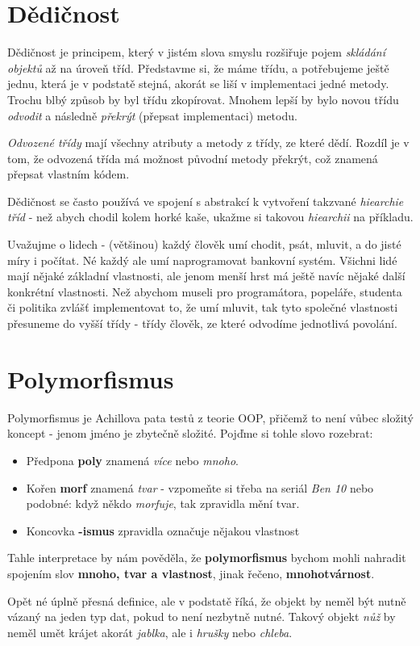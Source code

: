 \section{Dědičnost}
Dědičnost je principem, který v jistém slova smyslu rozšiřuje pojem \textit{skládání objektů} až na úroveň tříd. Představme si, že máme třídu, a potřebujeme ještě jednu, která je v podstatě stejná, akorát se liší v implementaci jedné metody. Trochu blbý způsob by byl třídu zkopírovat. Mnohem lepší by bylo novou třídu \textit{odvodit} a následně \textit{překrýt} (přepsat implementaci) metodu.

\textit{Odvozené třídy} mají všechny atributy a metody z třídy, ze které dědí. Rozdíl je v tom, že odvozená třída má možnost původní metody překrýt, což znamená přepsat vlastním kódem.

Dědičnost se často používá ve spojení s abstrakcí k vytvoření takzvané \textit{hiearchie tříd} - než abych chodil kolem horké kaše, ukažme si takovou \textit{hiearchii} na příkladu.

Uvažujme o lidech - (většinou) každý člověk umí chodit, psát, mluvit, a do jisté míry i počítat. Né každý ale umí naprogramovat bankovní systém. Všichni lidé mají nějaké základní vlastnosti, ale jenom menší hrst má ještě navíc nějaké další konkrétní vlastnosti. Než abychom museli pro programátora, popeláře, studenta či politika zvlášť implementovat to, že umí mluvit, tak tyto společné vlastnosti přesuneme do vyšší třídy - třídy člověk, ze které odvodíme jednotlivá povolání. 

\section{Polymorfismus}
Polymorfismus je Achillova pata testů z teorie OOP, přičemž to není vůbec složitý koncept - jenom jméno je zbytečně složité. Pojďme si tohle slovo rozebrat:
\begin{itemize}
	\item Předpona \textbf{poly} znamená \textit{více} nebo \textit{mnoho}.
	\item Kořen \textbf{morf} znamená \textit{tvar} - vzpomeňte si třeba na seriál \textit{Ben 10} nebo podobné: když někdo \textit{morfuje}, tak zpravidla mění tvar.
	\item Koncovka \textbf{-ismus} zpravidla označuje nějakou vlastnost
\end{itemize}

Tahle interpretace by nám pověděla, že \textbf{polymorfismus} bychom mohli nahradit spojením slov \textbf{mnoho, tvar a vlastnost}, jinak řečeno, \textbf{mnohotvárnost}.

Opět né úplně přesná definice, ale v podstatě říká, že objekt by neměl být nutně vázaný na jeden typ dat, pokud to není nezbytně nutné. Takový objekt \textit{nůž} by neměl umět krájet akorát \textit{jablka}, ale i \textit{hrušky} nebo \textit{chleba}.